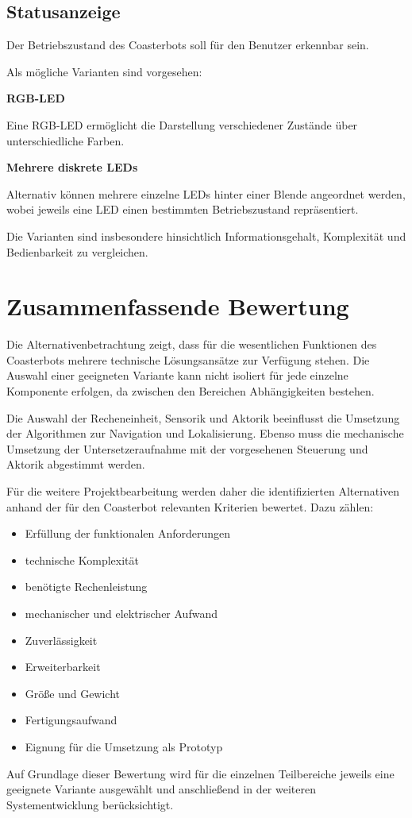 \subsection{Statusanzeige}\label{statusanzeige}

Der Betriebszustand des Coasterbots soll für den Benutzer erkennbar
sein.

Als mögliche Varianten sind vorgesehen:

\textbf{RGB-LED}

Eine RGB-LED ermöglicht die Darstellung verschiedener Zustände über
unterschiedliche Farben.

\textbf{Mehrere diskrete LEDs}

Alternativ können mehrere einzelne LEDs hinter einer Blende angeordnet
werden, wobei jeweils eine LED einen bestimmten Betriebszustand
repräsentiert.

Die Varianten sind insbesondere hinsichtlich Informationsgehalt,
Komplexität und Bedienbarkeit zu vergleichen.

\section{Zusammenfassende Bewertung}\label{zusammenfassende-bewertung}

Die Alternativenbetrachtung zeigt, dass für die wesentlichen Funktionen
des Coasterbots mehrere technische Lösungsansätze zur Verfügung stehen.
Die Auswahl einer geeigneten Variante kann nicht isoliert für jede
einzelne Komponente erfolgen, da zwischen den Bereichen Abhängigkeiten
bestehen.

Die Auswahl der Recheneinheit, Sensorik und Aktorik beeinflusst die
Umsetzung der Algorithmen zur Navigation und Lokalisierung. Ebenso muss
die mechanische Umsetzung der Untersetzeraufnahme mit der vorgesehenen
Steuerung und Aktorik abgestimmt werden.

Für die weitere Projektbearbeitung werden daher die identifizierten
Alternativen anhand der für den Coasterbot relevanten Kriterien
bewertet. Dazu zählen:

\begin{itemize}
\tightlist
\item
  Erfüllung der funktionalen Anforderungen
\item
  technische Komplexität
\item
  benötigte Rechenleistung
\item
  mechanischer und elektrischer Aufwand
\item
  Zuverlässigkeit
\item
  Erweiterbarkeit
\item
  Größe und Gewicht
\item
  Fertigungsaufwand
\item
  Eignung für die Umsetzung als Prototyp
\end{itemize}

Auf Grundlage dieser Bewertung wird für die einzelnen Teilbereiche
jeweils eine geeignete Variante ausgewählt und anschließend in der
weiteren Systementwicklung berücksichtigt.
